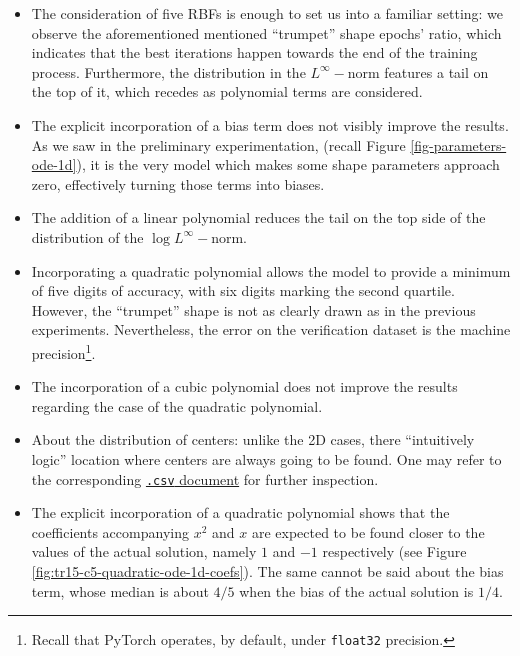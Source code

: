 \documentclass[12pt]{report} %
\begin{document}
\begin{itemize}
  \item The consideration of five RBFs is enough to
        set us into a familiar setting:
        we observe the aforementioned mentioned ``trumpet'' shape epochs' ratio, which indicates that
        the best iterations happen towards the end of the training process.
        Furthermore, the distribution in the $L^\infty-$norm features a tail on the top of it, which
        recedes as polynomial terms are considered.
  \item The explicit incorporation of a bias term
        does not visibly improve the results. As we saw in the preliminary experimentation,
        (recall Figure \ref{fig-parameters-ode-1d}), it is the very model which makes some shape
        parameters approach zero, effectively turning those terms into biases.
  \item The addition of a linear polynomial
        reduces the tail on the top side of the distribution of the $\log L^\infty-$norm.
  \item Incorporating a quadratic polynomial
        allows the model to provide a minimum of five digits of accuracy, with six digits marking
        the second quartile. However, the ``trumpet'' shape is not as clearly drawn as in the previous
        experiments. Nevertheless, the error on the verification dataset is the machine precision\footnote{Recall that PyTorch operates, by default, under \texttt{float32} precision.}.
  \item The incorporation of a cubic polynomial
        does not improve the results regarding the case of the quadratic polynomial.
  \item About the distribution of centers: unlike the 2D cases,
        there ``intuitively logic'' location where centers are always going to be found. One may refer to the corresponding \href{https://github.com/heqro/tfm-experiments/blob/main/memoria/experiments_results/ode_1d_u_xx-2.csv}{\texttt{.csv} document} for further inspection.
  \item The explicit incorporation of a quadratic polynomial shows that the coefficients accompanying $x^2$ and $x$ are expected to be found closer to the values of the actual solution, namely $1$ and $-1$ respectively (see Figure \ref{fig:tr15-c5-quadratic-ode-1d-coefs}). The same cannot be said about the bias term, whose median is about $4/5$ when the bias of the actual solution is $1/4$.
\end{itemize}
\end{document}
